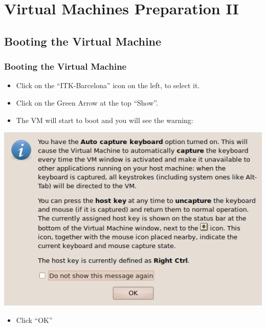 \section{Virtual Machines Preparation II}


\subsection{Booting the Virtual Machine}
\begin{frame}
\frametitle{Booting the Virtual Machine}
\begin{itemize}
\item Click on the ``ITK-Barcelona'' icon on the left, to select it.
\item Click on the Green Arrow at the top ``Show''.
\item The VM will start to boot and you will see the warning:
\end{itemize}
\begin{center}
  \includegraphics[width=0.4\paperwidth]{../Art/Screenshot-VirtualBox-OSE-02.png}
\end{center}
\begin{itemize}
\item Click ``OK''
\end{itemize}
\end{frame}

